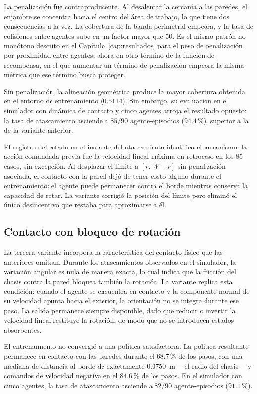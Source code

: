 La penalización fue contraproducente. Al desalentar la cercanía a las paredes, el enjambre se concentra hacia el centro del área de trabajo, lo que tiene dos consecuencias a la vez. La cobertura de la banda perimetral empeora, y la tasa de colisiones entre agentes sube en un factor mayor que 50. Es el mismo patrón no monótono descrito en el Capítulo~\ref{cap:resultados} para el peso de penalización por proximidad entre agentes, ahora en otro término de la función de recompensa, en el que aumentar un término de penalización empeora la misma métrica que ese término busca proteger.

Sin penalización, la alineación geométrica produce la mayor cobertura obtenida
en el entorno de entrenamiento ($0{.}5114$). Sin embargo, su evaluación en el
simulador con dinámica de contacto y cinco agentes arroja el resultado
opuesto: la tasa de atascamiento asciende a $85/90$ agente-episodios
($94{.}4$\,\%), superior a la de la variante anterior.

El registro del estado en el instante del atascamiento identifica el
mecanismo: la acción comandada previa fue la velocidad lineal máxima
en retroceso en los 85 casos, sin excepción. Al desplazar el límite a
$[r,\, W-r]$ sin penalización asociada, el contacto con la pared dejó de tener
costo alguno durante el entrenamiento: el agente puede permanecer contra el
borde mientras conserva la capacidad de rotar. La variante corrigió la
posición del límite pero eliminó el único desincentivo que restaba para
aproximarse a él.

\subsection*{Contacto con bloqueo de rotación}

La tercera variante incorpora la característica del contacto físico que las
anteriores omitían. Durante los atascamientos observados en el simulador, la
variación angular es nula de manera exacta, lo cual indica que la fricción del
chasis contra la pared bloquea también la rotación. La variante replica esta
condición: cuando el agente se encuentra en contacto y la componente normal de
su velocidad apunta hacia el exterior, la orientación no se integra durante
ese paso. La salida permanece siempre disponible, dado que reducir o invertir
la velocidad lineal restituye la rotación, de modo que no se introducen
estados absorbentes.

El entrenamiento no convergió a una política satisfactoria. La política
resultante permanece en contacto con las paredes durante el $68{.}7$\,\% de
los pasos, con una mediana de distancia al borde de exactamente $0{.}0750$~m
—el radio del chasis— y comandos de velocidad negativa en el $84{.}6$\,\% de
los pasos. En el simulador con cinco agentes, la tasa de atascamiento asciende
a $82/90$ agente-episodios ($91{.}1$\,\%).

